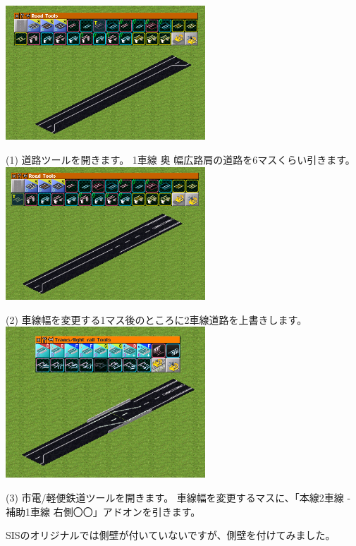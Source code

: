 \documentclass{jarticle}
\begin{document}
\begin{multicols}{2}


\includegraphics[width = 75mm]{picture/20210214-road-4-1.png}

(1)
道路ツールを開きます。
1車線 奥 幅広路肩の道路を6マスくらい引きます。\\



\includegraphics[width = 75mm]{picture/20210214-road-4-2.png}

(2)
車線幅を変更する1マス後のところに2車線道路を上書きします。\\



\includegraphics[width = 75mm]{picture/20210214-road-4-3.png}

(3)
市電/軽便鉄道ツールを開きます。
車線幅を変更するマスに、「本線2車線 - 補助1車線 右側〇〇」アドオンを引きます。

SISのオリジナルでは側壁が付いていないですが、側壁を付けてみました。\\




\end{multicols}
\end{document}
